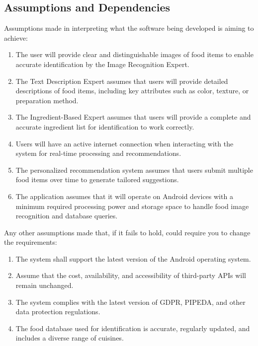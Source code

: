 \documentclass[]{article}
\begin{document}
\subsection{Assumptions and Dependencies}
\label{sub:assumptions_and_dependencies}
Assumptions made in interpreting what the software being developed is aiming to achieve:
	\begin{enumerate}
		\item The user will provide clear and distinguishable images of food items to enable accurate identification by the Image Recognition Expert.
		\item The Text Description Expert assumes that users will provide detailed descriptions of food items, including key attributes such as color, texture, or preparation method.
		\item The Ingredient-Based Expert assumes that users will provide a complete and accurate ingredient list for identification to work correctly.
		\item Users will have an active internet connection when interacting with the system for real-time processing and recommendations.
		\item The personalized recommendation system assumes that users submit multiple food items over time to generate tailored suggestions.
		\item The application assumes that it will operate on Android devices with a minimum required processing power and storage space to handle food image recognition and database queries.
	\end{enumerate}

Any other assumptions made that, if it fails to hold, could require you to change the requirements:
	\begin{enumerate}
		\item The system shall support the latest version of the Android operating system.
		\item Assume that the cost, availability, and accessibility of third-party APIs will remain unchanged.
		\item The system complies with the latest version of GDPR, PIPEDA, and other data protection regulations.
		\item The food database used for identification is accurate, regularly updated, and includes a diverse range of cuisines.
	\end{enumerate}
\end{document}
